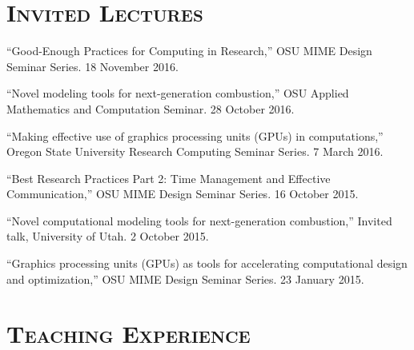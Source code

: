 \documentclass[margin,line,11pt]{res}
\makeatletter
\newlength{\bibhang}
\newlength{\bibsep}
 {\@listi \global\bibsep\itemsep \global\advance\bibsep by\parsep}
\newenvironment{bibenum*}
  {\renewcommand\labelenumi{\theenumi.}%
   \etaremune[
     topsep=0pt,
     itemsep=\bibsep,
     parsep=0pt,partopsep=0pt,
     itemindent=-\bibhang,
     leftmargin={\bibhang+\widthof{[999]}}]}
  {\endetaremune}
\newcommand*{\doi}[1]{\href{https://doi.org/#1}{\nolinkurl{https://doi.org/#1}}}
\makeatother
\begin{document}
\begin{resume}
\begin{bibenum*}
\end{bibenum*}

\section{\textsc{Invited Lectures}}

\begin{bibenum*}
\item ``Good-Enough Practices for Computing in Research,''
OSU MIME Design Seminar Series. 18 November 2016.

\item ``Novel modeling tools for next-generation combustion,''
OSU Applied Mathematics and Computation Seminar. 28 October 2016.

\item ``Making effective use of graphics processing units (GPUs) in computations,''
Oregon State University Research Computing Seminar Series. 7 March 2016.

\item ``Best Research Practices Part 2: Time Management and Effective Communication,''
OSU MIME Design Seminar Series. 16 October 2015.

\item ``Novel computational modeling tools for next-generation combustion,''
Invited talk, University of Utah. 2 October 2015.

\item ``Graphics processing units (GPUs) as tools for accelerating computational design and optimization,''
OSU MIME Design Seminar Series. 23 January 2015.

\end{bibenum*}

%
%
%

\section{\textsc{Teaching Experience}}


\end{resume}
\end{document}
